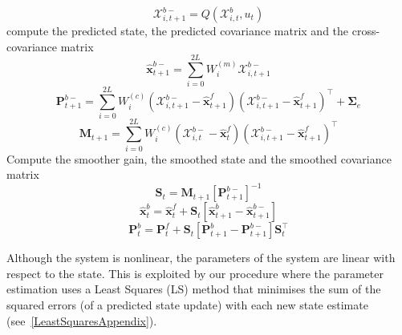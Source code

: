 \documentclass[12pt]{iopart}
\begin{document}
\begin{algorithm}
\begin{small}
\begin{algorithmic}[1]
		\begin{equation*}
			\mathcal X_{i,t+1}^{b-}=Q(\mathcal X_{i,t}^b,u_t) 
		\end{equation*}
		 compute the predicted state, the predicted covariance matrix and the cross-covariance matrix
		\begin{equation*}
			\hat{\mathbf x}_{t+1}^{b-}=\sum_{i=0}^{2L} W_i^{(m)}\mathcal X_{i,t+1}^{b-} 
		\end{equation*}
		\begin{equation*}
			\mathbf P_{t +1}^{b-}=\sum_{i=0}^{2L} W_i^{(c)}(\mathcal X_{i,t+1}^{b-}-\hat{\mathbf x}_{t +1}^{f})(\mathcal X_{i,t+1}^{b-}-\hat{\mathbf x}_{t +1}^{f})^\top+\boldsymbol \Sigma_e 
		\end{equation*}
		\begin{equation*}
			\mathbf M_{t +1}=\sum_{i=0}^{2L} W_i^{(c)}(\mathcal X_{i,t}^{b-}-\hat{\mathbf x}_{t}^{f})(\mathcal X_{i,t+1}^{b-}-\hat{\mathbf x}_{t+1}^{f})^\top 
		\end{equation*}
		 Compute the smoother gain, the smoothed state and the smoothed covariance matrix
		\begin{equation*}
			\mathbf S_t=\mathbf M_{t +1}\left[ \mathbf P_{t +1}^{b-}\right] ^{-1} 
		\end{equation*}
		\begin{equation*}
			\hat{\mathbf x}_t^b=\hat{\mathbf x}_t^f+\mathbf S_t\left[\hat{\mathbf x}_{t+1}^{b}-\hat{\mathbf x}_{t+1}^{b-}\right] 
		\end{equation*}
		\begin{equation*}
			\mathbf P_{t}^{b}=\mathbf P_{t}^{f}+\mathbf S_t\left[\mathbf P_{t+1}^{b}-\mathbf P_{t+1}^{b-} \right]\mathbf S_t^\top 
		\end{equation*}
	\end{algorithmic}
\end{small}
\end{algorithm}

Although the system is nonlinear, the parameters of the system are linear with respect to the state. This is exploited by our procedure where the parameter estimation uses a Least Squares (LS) method that minimises the sum of the squared errors (of a predicted state update) with each new state estimate (see~\ref{LeastSquaresAppendix}).
\end{document}
